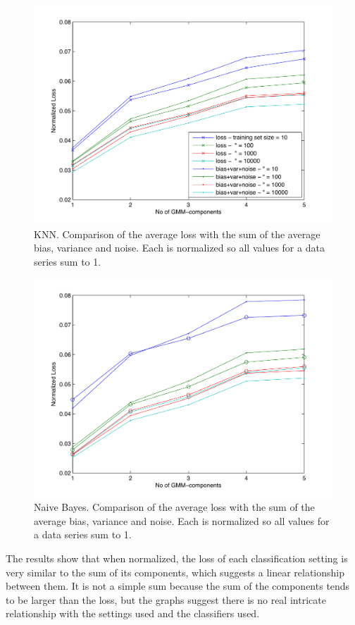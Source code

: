 \documentclass[a4paper]{article}
\begin{document}
\begin{figure}[htb]
    \centering
    \includegraphics[width=.9\textwidth]{5040_knn_losscomp.pdf}
    \caption{KNN. Comparison of the average loss with the sum of the average bias, variance and noise. Each is normalized so all values for a data series sum to 1. \label{fig:knnlosscomp}}
\end{figure}

\begin{figure}[htb]
    \centering
    \includegraphics[width=.9\textwidth]{5050_nb_losscomp.pdf}
    \caption{Naive Bayes. Comparison of the average loss with the sum of the average bias, variance and noise. Each is normalized so all values for a data series sum to 1. \label{fig:nblosscomp}}
\end{figure}

The results show that when normalized, the loss of each classification setting is very similar to the sum of its components, which suggests a linear relationship between them. It is not a simple sum because the sum of the components tends to be larger than the loss, but the graphs suggest there is no real intricate relationship with the settings used and the classifiers used.
\end{document}
